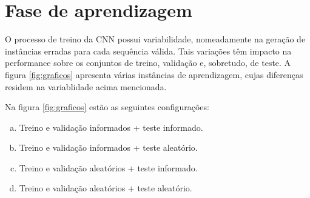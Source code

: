 \section{Fase de aprendizagem}
\label{chap3:sec:aprendizagem}
O processo de treino da \ac{CNN} possui variabilidade, nomeadamente na geração de instâncias erradas para cada sequência válida. Tais variações têm impacto na performance sobre os conjuntos de treino, validação e, sobretudo, de teste.\newline
\noindent A figura \ref{fig:graficos} apresenta várias instâncias de aprendizagem, cujas diferenças residem na variablidade acima mencionada.

\noindent Na figura \ref{fig:graficos} estão as seguintes configurações:
\begin{enumerate}[(a)]
    \item Treino e validação informados + teste informado.
    \item Treino e validação informados + teste aleatório.
    \item Treino e validação aleatórios + teste informado.
    \item Treino e validação aleatórios + teste aleatório.
\end{enumerate}{}

